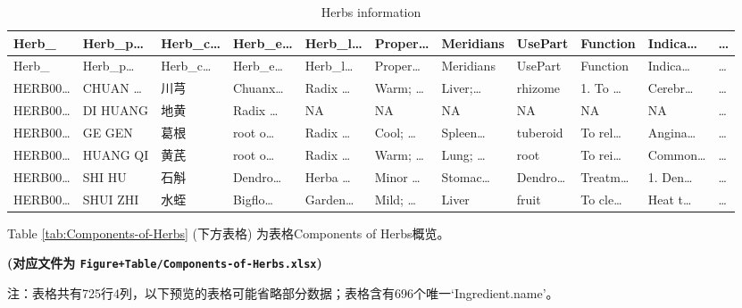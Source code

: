 \documentclass[
]{article}
\begin{document}
\begin{longtable}[]{@{}lllllllllll@{}}
\caption{\label{tab:Herbs-information}Herbs information}\tabularnewline
\toprule
Herb\_ & Herb\_p\ldots{} & Herb\_c\ldots{} & Herb\_e\ldots{} & Herb\_l\ldots{} & Proper\ldots{} & Meridians & UsePart & Function & Indica\ldots{} & \ldots{}\tabularnewline
\midrule
\endfirsthead
\toprule
Herb\_ & Herb\_p\ldots{} & Herb\_c\ldots{} & Herb\_e\ldots{} & Herb\_l\ldots{} & Proper\ldots{} & Meridians & UsePart & Function & Indica\ldots{} & \ldots{}\tabularnewline
\midrule
\endhead
HERB00\ldots{} & CHUAN \ldots{} & 川芎 & Chuanx\ldots{} & Radix \ldots{} & Warm; \ldots{} & Liver;\ldots{} & rhizome & 1. To \ldots{} & Cerebr\ldots{} & \ldots{}\tabularnewline
HERB00\ldots{} & DI HUANG & 地黄 & Radix \ldots{} & NA & NA & NA & NA & NA & NA & \ldots{}\tabularnewline
HERB00\ldots{} & GE GEN & 葛根 & root o\ldots{} & Radix \ldots{} & Cool; \ldots{} & Spleen\ldots{} & tuberoid & To rel\ldots{} & Angina\ldots{} & \ldots{}\tabularnewline
HERB00\ldots{} & HUANG QI & 黄芪 & root o\ldots{} & Radix \ldots{} & Warm; \ldots{} & Lung; \ldots{} & root & To rei\ldots{} & Common\ldots{} & \ldots{}\tabularnewline
HERB00\ldots{} & SHI HU & 石斛 & Dendro\ldots{} & Herba \ldots{} & Minor \ldots{} & Stomac\ldots{} & Dendro\ldots{} & Treatm\ldots{} & 1. Den\ldots{} & \ldots{}\tabularnewline
HERB00\ldots{} & SHUI ZHI & 水蛭 & Bigflo\ldots{} & Garden\ldots{} & Mild; \ldots{} & Liver & fruit & To cle\ldots{} & Heat t\ldots{} & \ldots{}\tabularnewline
\bottomrule
\end{longtable}

Table \ref{tab:Components-of-Herbs} (下方表格) 为表格Components of Herbs概览。

\textbf{(对应文件为 \texttt{Figure+Table/Components-of-Herbs.xlsx})}

\begin{center}\begin{tcolorbox}[colback=gray!10, colframe=gray!50, width=0.9\linewidth, arc=1mm, boxrule=0.5pt]注：表格共有725行4列，以下预览的表格可能省略部分数据；表格含有696个唯一`Ingredient.name'。
\end{tcolorbox}
\end{center}
\end{document}
